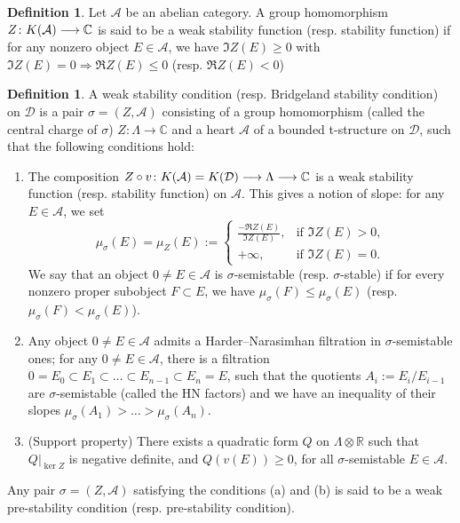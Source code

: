 \documentclass[12pt]{amsart}
\theoremstyle{definition}
\newtheorem{definition}[theorem]{Definition}
\begin{document}
\begin{definition}
Let $\mathcal{A}$ be an abelian category. A group homomorphism $Z\colon {\rm K}(\mathcal{A}) \longrightarrow \mathbb{C}$ is said to be a weak stability function (resp. stability function) if for any nonzero object $E\in \mathcal{A}$, we have $\Im Z(E) \geq 0$ with $\Im Z(E) = 0 \Rightarrow \Re Z(E) \leq 0$ (resp. $ \Re Z(E) < 0$)
\end{definition}

\begin{definition}\label{stability}
A weak stability condition (resp. Bridgeland stability condition) on $\mathcal{D}$ is a pair $\sigma = (Z,\mathcal{A})$ consisting of a group homomorphism (called the central charge of $\sigma$) $Z \colon \Lambda \longrightarrow \mathbb{C}$ and a heart $\mathcal{A}$ of a bounded t-structure on $\mathcal{D}$, such that the following conditions hold:
\begin{enumerate}
    \item[(a)] The composition $Z \circ v \colon {\rm K}(\mathcal{A})={\rm K}(\mathcal{D}) \longrightarrow \Lambda \longrightarrow \mathbb{C}$ is a weak stability function (resp. stability function) on $\mathcal{A}$. This gives a notion of slope: for any $E \in \mathcal{A}$, we set
    \begin{equation}
    \mu_\sigma(E)=\mu_Z(E):=
    \begin{cases}
    \frac{-\Re Z(E)}{\Im Z(E)}, & \text{if } \Im Z(E)>0, \\
    +\infty, & \text{if } \Im Z(E)=0.
    \end{cases}
    \end{equation}
    We say that an object $0\neq E \in \mathcal{A}$ is $\sigma$-semistable (resp. $\sigma$-stable) if for every nonzero proper subobject $F \subset E$, we have $\mu_\sigma (F) \leq \mu_\sigma (E)$ (resp. $\mu_\sigma (F) < \mu_\sigma (E)$).
    
    \item[(b)] Any object $0\neq E \in \mathcal{A}$ admits a Harder--Narasimhan filtration in $\sigma$-semistable ones; for any $0\neq E \in \mathcal{A}$, there is a filtration $0=E_0 \subset E_1\subset \dots \subset E_{n-1} \subset E_n=E$, such that the quotients $A_i:=E_i/E_{i-1}$ are $\sigma$-semistable (called the HN factors) and we have an inequality of their slopes $\mu_\sigma(A_1)> \dots >\mu_\sigma(A_n)$.
    \item[(c)] (Support property) There exists a quadratic form $Q$ on $\Lambda \otimes \mathbb{R}$ such that $Q|_{\ker Z}$ is negative definite, and $Q(v(E))\geq 0$, for all $\sigma$-semistable $E \in \mathcal{A}$.
\end{enumerate}
Any pair $\sigma=(Z,\mathcal{A})$ satisfying the conditions (a) and (b) is said to be a weak pre-stability condition (resp. pre-stability condition).
\end{definition}
\end{document}

